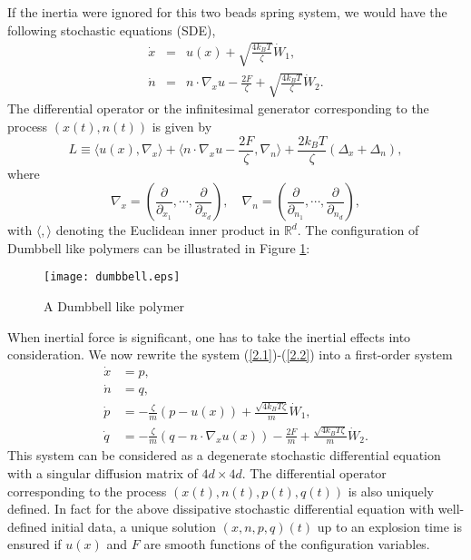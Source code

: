 \documentclass[reqno]{amsart}
\numberwithin{equation}{section}
\theoremstyle{definition}
\theoremstyle{remark}
\begin{document}
If the inertia were ignored for this two beads spring system, we
would have the following stochastic equations (SDE),
\begin{eqnarray}\label{xn1}
             
               \dot x & =&u(x) +\sqrt{\frac{4k_BT}{\zeta}}\dot
               W_1,\\ \label{xn2}
               \dot n & =&n\cdot \nabla_x u -\frac{2F}{\zeta}+\sqrt{\frac{4k_BT}{\zeta}}\dot W_2.
             \end{eqnarray}
The differential operator or the infinitesimal generator corresponding to the process $(x(t), n(t))$
is given by
\begin{equation}\label{L1}
L\equiv \langle u(x), \nabla_x\rangle + \langle n\cdot \nabla_x u
-\frac{2F}{\zeta}, \nabla_n\rangle +\frac{2k_BT}{\zeta}(\Delta_x
+\Delta_n),
\end{equation}
where
$$
\nabla_x=\left(\frac{\partial}{\partial_{x_1}}, \cdots, \frac{\partial}{\partial_{x_d}}\right), \quad
\nabla_n=\left(\frac{\partial}{\partial_{n_1}}, \cdots, \frac{\partial}{\partial_{n_d}}\right),
$$
with $\langle, \rangle$ denoting the Euclidean inner product in
$\mathbb{R}^d$. The configuration of Dumbbell like polymers can be
illustrated in Figure \ref{fig1}:
\begin{figure}[pth]
\begin{center}

\texttt{[image: dumbbell.eps]}
\caption{A Dumbbell like polymer}\label{fig1}
\end{center}
\end{figure}

When inertial force is significant, one has to take the inertial effects into consideration.
We now rewrite the system (\ref{2.1})-(\ref{2.2}) into a first-order system
\begin{align*}
\dot x & =p,\\
\dot n &=q,\\
\dot p &=-\frac{\zeta}{m}(p-u(x))+\frac{\sqrt{4k_BT\zeta}}{m}\dot W_1,\\
\dot q &= -\frac{\zeta}{m}(q-n\cdot \nabla_x u(x)) -\frac{2F}{m}+
\frac{\sqrt{4k_BT\zeta}}{m}\dot W_2.
\end{align*}
This system can be considered as a degenerate stochastic differential equation with a singular diffusion matrix of $4d \times 4d$. The differential operator corresponding to the process $(x(t), n(t), p(t), q(t))$
is also uniquely defined. In fact for the above dissipative stochastic differential equation with well-defined initial data, a unique solution $(x, n, p, q)(t)$ up to an explosion time is ensured if  $u(x)$  and $F$  are smooth functions of the configuration variables.
\end{document}
